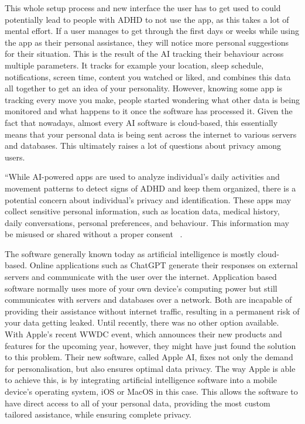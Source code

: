 \documentclass[english]{hogent-article}
\begin{document}
This whole setup process and new interface the user has to get used to could potentially lead to people with ADHD to not use the app, as this takes a lot of mental effort. If a user manages to get through the first days or weeks while using the app as their personal assistance, they will notice more personal suggestions for their situation. This is the result of the AI tracking their behaviour across multiple parameters. It tracks for example your location, sleep schedule, notifications, screen time, content you watched or liked, and combines this data all together to get an idea of your personality. However, knowing some app is tracking every move you make, people started wondering what other data is being monitored and what happens to it once the software has processed it. Given the fact that nowadays, almost every AI software is cloud-based, this essentially means that your personal data is being sent across the internet to various servers and databases. This ultimately raises a lot of questions about privacy among users.

“While AI-powered apps are used to analyze individual’s daily activities and movement patterns to detect signs of ADHD and keep them organized, there is a potential concern about individual’s privacy and identification. These apps may collect sensitive personal information, such as location data, medical history, daily conversations, personal preferences, and behaviour. This information may be misused or shared without a proper consent ~\autocite{Rahman2023}.

The software generally known today as artificial intelligence is mostly cloud-based. Online applications such as ChatGPT generate their responses on external servers and communicate with the user over the internet. Application based software normally uses more of your own device's computing power but still communicates with servers and databases over a network. Both are incapable of providing their assistance without internet traffic, resulting in a permanent risk of your data getting leaked. Until recently, there was no other option available. With Apple's recent WWDC event, which announces their new products and features for the upcoming year, however, they might have just found the solution to this problem. Their new software, called Apple AI, fixes not only the demand for personalisation, but also ensures optimal data privacy. The way Apple is able to achieve this, is by integrating artificial intelligence software into a mobile device's operating system,  iOS or MacOS in this case. This allows the software to have direct access to all of your personal data, providing the most custom tailored assistance, while ensuring complete privacy.
\end{document}
